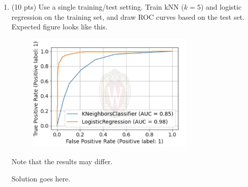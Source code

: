 \documentclass[a4paper]{article}
\theoremstyle{definition}
\newenvironment{soln}{
    \leavevmode\color{blue}\ignorespaces
}{}
\begin{document}
\begin{enumerate}
  \item (10 pts) Use a single training/test setting. Train kNN ($k=5$) and logistic regression on the training set, and draw ROC curves based on the test set. \\
        Expected figure looks like this.
        \begin{figure}[h!]
          \centering
          \includegraphics[width=8cm]{roc.png}
        \end{figure}
        Note that the results may differ.

        \begin{soln}  Solution goes here. \end{soln}

\end{enumerate}

\end{document}
